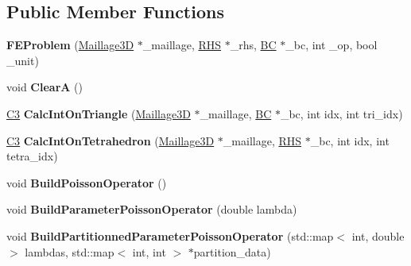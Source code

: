 \subsection*{Public Member Functions}
\begin{DoxyCompactItemize}
\item 
{\bfseries F\+E\+Problem} (\hyperlink{class_maillage3_d}{Maillage3D} $\ast$\+\_\+maillage, \hyperlink{class_r_h_s}{R\+HS} $\ast$\+\_\+rhs, \hyperlink{class_b_c}{BC} $\ast$\+\_\+bc, int \+\_\+op, bool \+\_\+unit)\hypertarget{class_f_e_problem_a2533222abf90fc2d04a4234a1014f297}{}\label{class_f_e_problem_a2533222abf90fc2d04a4234a1014f297}

\item 
void {\bfseries ClearA} ()\hypertarget{class_f_e_problem_a8cfe4ef4c62f979abddf7cbbf4eb865d}{}\label{class_f_e_problem_a8cfe4ef4c62f979abddf7cbbf4eb865d}

\item 
\hyperlink{class_c3}{C3} {\bfseries Calc\+Int\+On\+Triangle} (\hyperlink{class_maillage3_d}{Maillage3D} $\ast$\+\_\+maillage, \hyperlink{class_b_c}{BC} $\ast$\+\_\+bc, int idx, int tri\+\_\+idx)\hypertarget{class_f_e_problem_a0840b3f7f979205c10c6e0540fd351f3}{}\label{class_f_e_problem_a0840b3f7f979205c10c6e0540fd351f3}

\item 
\hyperlink{class_c3}{C3} {\bfseries Calc\+Int\+On\+Tetrahedron} (\hyperlink{class_maillage3_d}{Maillage3D} $\ast$\+\_\+maillage, \hyperlink{class_r_h_s}{R\+HS} $\ast$\+\_\+bc, int idx, int tetra\+\_\+idx)\hypertarget{class_f_e_problem_a488637fda62991b5f6e41ce6b6c67234}{}\label{class_f_e_problem_a488637fda62991b5f6e41ce6b6c67234}

\item 
void {\bfseries Build\+Poisson\+Operator} ()\hypertarget{class_f_e_problem_a93b43c73b15cd0fc2e794f8c9a95c3b4}{}\label{class_f_e_problem_a93b43c73b15cd0fc2e794f8c9a95c3b4}

\item 
void {\bfseries Build\+Parameter\+Poisson\+Operator} (double lambda)\hypertarget{class_f_e_problem_a88a0511cfde10f33442b0f31f0f4840e}{}\label{class_f_e_problem_a88a0511cfde10f33442b0f31f0f4840e}

\item 
void {\bfseries Build\+Partitionned\+Parameter\+Poisson\+Operator} (std\+::map$<$ int, double $>$ lambdas, std\+::map$<$ int, int $>$ $\ast$partition\+\_\+data)\hypertarget{class_f_e_problem_ae7f707511e3f03879a4c37de25af262f}{}\label{class_f_e_problem_ae7f707511e3f03879a4c37de25af262f}


\end{DoxyCompactItemize}

